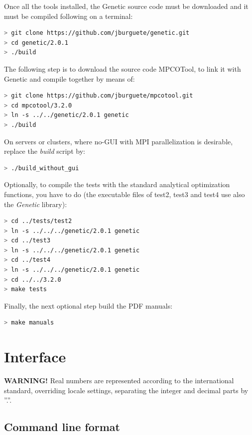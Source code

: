 \documentclass[a4paper]{report}
\begin{document}
Once all the tools installed, the Genetic source code must be downloaded and it must be compiled following on a terminal:
\begin{lstlisting}[language=bash,basicstyle=\scriptsize]
> git clone https://github.com/jburguete/genetic.git
> cd genetic/2.0.1
> ./build
\end{lstlisting}

The following step is to download the source code MPCOTool, to link it with Genetic and compile together by means of:
\begin{lstlisting}[language=bash,basicstyle=\scriptsize]
> git clone https://github.com/jburguete/mpcotool.git
> cd mpcotool/3.2.0
> ln -s ../../genetic/2.0.1 genetic
> ./build
\end{lstlisting}

On servers or clusters, where no-GUI with MPI parallelization is desirable,
replace the \emph{build} script by:
\begin{lstlisting}[language=bash,basicstyle=\scriptsize]
> ./build_without_gui
\end{lstlisting}
 
Optionally, to compile the tests with the standard analytical optimization
functions, you have to do (the executable files of test2, test3 and test4 use
also the \emph{Genetic} library):
\begin{lstlisting}[language=bash,basicstyle=\scriptsize]
> cd ../tests/test2
> ln -s ../../../genetic/2.0.1 genetic
> cd ../test3
> ln -s ../../../genetic/2.0.1 genetic
> cd ../test4
> ln -s ../../../genetic/2.0.1 genetic
> cd ../../3.2.0
> make tests
\end{lstlisting}

Finally, the next optional step build the PDF manuals:
\begin{lstlisting}[language=bash,basicstyle=\scriptsize]
> make manuals
\end{lstlisting}

\chapter{Interface}

{\bf WARNING!} Real numbers are represented according to the international
standard, overriding locale settings, separating the integer and decimal parts
by ''.''.

\section{Command line format}
\end{document}
